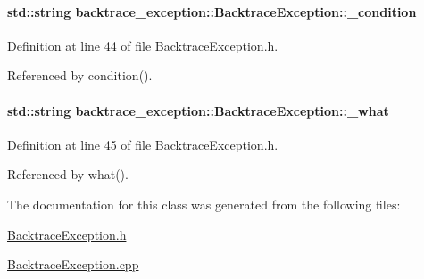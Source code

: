 \hypertarget{classbacktrace__exception_1_1BacktraceException_a3e43ec7625a2390fdfad8fffd4ab126c}{
\paragraph[{\-\_\-condition}]{\setlength{\rightskip}{0pt plus 5cm}std\-::string backtrace\-\_\-exception\-::\-Backtrace\-Exception\-::\-\_\-condition\hspace{0.3cm}{\ttfamily [protected]}}}\label{classbacktrace__exception_1_1BacktraceException_a3e43ec7625a2390fdfad8fffd4ab126c}


Definition at line 44 of file Backtrace\-Exception.\-h.



Referenced by condition().

\hypertarget{classbacktrace__exception_1_1BacktraceException_ad935d6512b6b4a6c4ea79843391b5a1e}{
\paragraph[{\-\_\-what}]{\setlength{\rightskip}{0pt plus 5cm}std\-::string backtrace\-\_\-exception\-::\-Backtrace\-Exception\-::\-\_\-what\hspace{0.3cm}{\ttfamily [protected]}}}\label{classbacktrace__exception_1_1BacktraceException_ad935d6512b6b4a6c4ea79843391b5a1e}


Definition at line 45 of file Backtrace\-Exception.\-h.



Referenced by what().



The documentation for this class was generated from the following files\-:\begin{DoxyCompactItemize}
\item 
\hyperlink{BacktraceException_8h}{Backtrace\-Exception.\-h}\item 
\hyperlink{BacktraceException_8cpp}{Backtrace\-Exception.\-cpp}\end{DoxyCompactItemize}
